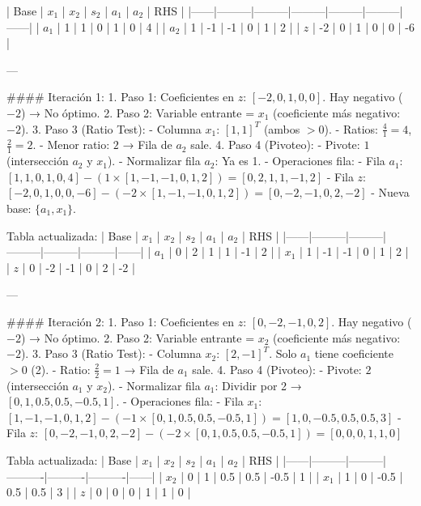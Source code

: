 | Base | \(x_1\) | \(x_2\) | \(s_2\) | \(a_1\) | \(a_2\) | RHS  |
|------|---------|---------|---------|---------|---------|------|
| \(a_1\) | 1       | 1       | 0       | 1       | 0       | 4    |
| \(a_2\) | 1       | -1      | -1      | 0       | 1       | 2    |
| \(z\)  | -2      | 0       | 1       | 0       | 0       | -6   |

---

#### Iteración 1:
1. Paso 1: Coeficientes en \(z\): \([-2, 0, 1, 0, 0]\). Hay negativo (\(-2\)) → No óptimo.
2. Paso 2: Variable entrante = \(x_1\) (coeficiente más negativo: \(-2\)).
3. Paso 3 (Ratio Test):
   - Columna \(x_1\): \([1, 1]^T\) (ambos \(> 0\)).
   - Ratios: \(\frac{4}{1} = 4\), \(\frac{2}{1} = 2\).
   - Menor ratio: \(2\) → Fila de \(a_2\) sale.
4. Paso 4 (Pivoteo):
   - Pivote: \(1\) (intersección \(a_2\) y \(x_1\)).
   - Normalizar fila \(a_2\): Ya es 1.
   - Operaciones fila:
     - Fila \(a_1\): \([1, 1, 0, 1, 0, 4] - (1 \times [1, -1, -1, 0, 1, 2]) = [0, 2, 1, 1, -1, 2]\)
     - Fila \(z\): \([-2, 0, 1, 0, 0, -6] - (-2 \times [1, -1, -1, 0, 1, 2]) = [0, -2, -1, 0, 2, -2]\)
   - Nueva base: \(\{a_1, x_1\}\).

Tabla actualizada:
| Base | \(x_1\) | \(x_2\) | \(s_2\) | \(a_1\) | \(a_2\) | RHS  |
|------|---------|---------|---------|---------|---------|------|
| \(a_1\) | 0       | 2       | 1       | 1       | -1      | 2    |
| \(x_1\) | 1       | -1      | -1      | 0       | 1       | 2    |
| \(z\)  | 0       | -2      | -1      | 0       | 2       | -2   |

---

#### Iteración 2:
1. Paso 1: Coeficientes en \(z\): \([0, -2, -1, 0, 2]\). Hay negativo (\(-2\)) → No óptimo.
2. Paso 2: Variable entrante = \(x_2\) (coeficiente más negativo: \(-2\)).
3. Paso 3 (Ratio Test):
   - Columna \(x_2\): \([2, -1]^T\). Solo \(a_1\) tiene coeficiente \(> 0\) (2).
   - Ratio: \(\frac{2}{2} = 1\) → Fila de \(a_1\) sale.
4. Paso 4 (Pivoteo):
   - Pivote: \(2\) (intersección \(a_1\) y \(x_2\)).
   - Normalizar fila \(a_1\): Dividir por 2 → \([0, 1, 0.5, 0.5, -0.5, 1]\).
   - Operaciones fila:
     - Fila \(x_1\): \([1, -1, -1, 0, 1, 2] - (-1 \times [0, 1, 0.5, 0.5, -0.5, 1]) = [1, 0, -0.5, 0.5, 0.5, 3]\)
     - Fila \(z\): \([0, -2, -1, 0, 2, -2] - (-2 \times [0, 1, 0.5, 0.5, -0.5, 1]) = [0, 0, 0, 1, 1, 0]\)

Tabla actualizada:
| Base | \(x_1\) | \(x_2\) | \(s_2\)  | \(a_1\)  | \(a_2\)  | RHS  |
|------|---------|---------|----------|----------|----------|------|
| \(x_2\) | 0       | 1       | 0.5      | 0.5      | -0.5     | 1    |
| \(x_1\) | 1       | 0       | -0.5     | 0.5      | 0.5      | 3    |
| \(z\)  | 0       | 0       | 0        | 1        | 1        | 0    |

